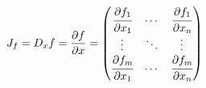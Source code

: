 $$J_f = D_x f = \frac{\partial f}{\partial x} = 
\begin{pmatrix}
\cfrac{\partial f_1}{\partial x_1} & \cdots & \cfrac{\partial f_1}{\partial x_n} \\
\vdots & \ddots & \vdots \\
\cfrac{\partial f_m}{\partial x_1} & \cdots & \cfrac{\partial f_m}{\partial x_n} 
\end{pmatrix}
$$
